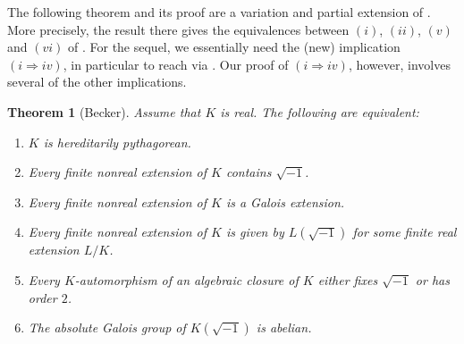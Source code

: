 \documentclass[12pt,leqno]{amsart}
\numberwithin{equation}{section}
\newtheorem{thm}[equation]{Theorem}
\theoremstyle{definition}
\theoremstyle{plain}
\begin{document}
The following theorem and its proof are a variation and partial extension of \cite[Chap.~III, Theorem 1]{Bec78}. More precisely, the result there gives the equivalences between $(i)$, $(ii)$, $(v)$ and $(vi)$ of .
For the sequel, we essentially need the (new) implication $(i\Rightarrow iv)$, in particular to reach  via .
Our proof of $(i\Rightarrow iv)$, however, involves several of the other implications.

\begin{thm}[Becker]\label{T:Becker-hp-equiv}
Assume that $K$ is real. The following are equivalent:
\begin{enumerate}[$(i)$]
    \item $K$ is hereditarily pythagorean.
    \item Every finite nonreal  extension of $K$ contains $\sqrt{-1}$.
    \item Every finite nonreal  extension of $K$ is a Galois extension.
    \item Every finite nonreal extension of $K$ is given by $L(\sqrt{-1})$ for some finite real extension $L/K$.
    \item Every $K$-automorphism  of an algebraic closure of $K$ either fixes $\sqrt{-1}$ or has order $2$.
    \item The absolute Galois group of $K(\sqrt{-1})$ is abelian.
\end{enumerate}
\end{thm}
\end{document}
